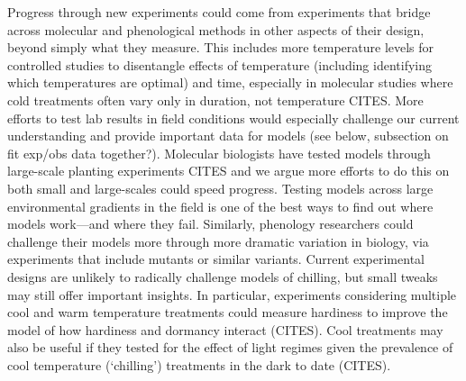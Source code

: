 \documentclass[11pt]{article}
\begin{document}
Progress through new experiments could come from experiments that bridge across molecular and phenological methods in other aspects of their design, beyond simply what they measure. This includes more temperature levels for controlled studies to disentangle effects of temperature (including identifying which temperatures are optimal) and time, especially in molecular studies where cold treatments often vary only in duration, not temperature CITES. More efforts to test lab results in field conditions would especially challenge our current understanding and provide important data for models (see below, subsection on fit exp/obs data together?). Molecular biologists have tested models through large-scale planting experiments CITES and we argue more efforts to do this on both small and large-scales could speed progress. Testing models across large environmental gradients in the field is one of the best ways to find out where models work---and where they fail. Similarly, phenology researchers could challenge their models more through more dramatic variation in biology, via experiments that include mutants or similar variants. 
Current experimental designs are unlikely to radically challenge models of chilling, but small tweaks may still offer important insights. In particular, experiments considering multiple cool and warm temperature treatments could measure hardiness to improve the model of how hardiness and dormancy interact (CITES). Cool treatments may also be useful if they tested for the effect of light regimes given the prevalence of cool temperature (`chilling') treatments in the dark to date (CITES). 
\end{document}
